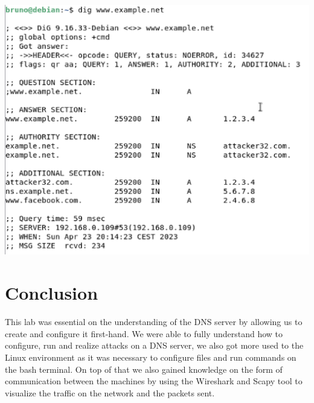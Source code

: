 \documentclass{article}
\begin{document}
\begin{center}
  \includegraphics[scale=0.5]{images/Task9.png}
\end{center}

\pagebreak
\section{Conclusion}

This lab was essential on the understanding of the DNS server by allowing us to create and configure it first-hand.
We were able to fully understand how to configure, run and realize attacks on a DNS server, we also got more used to the Linux environment as it was necessary to configure files and run commands on the bash terminal.
On top of that we also gained knowledge on the form of communication between the machines by using the Wireshark and Scapy tool to visualize the traffic on the network and the packets sent.
\end{document}
